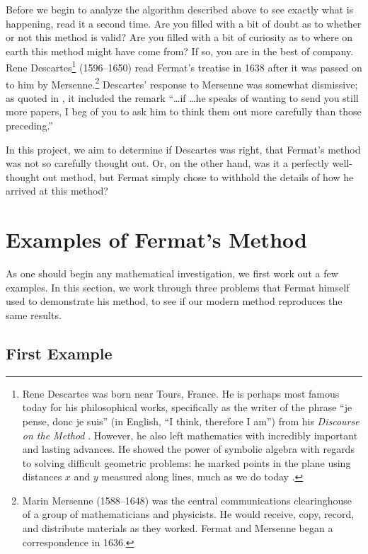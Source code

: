 \documentclass[11pt]{article}
\begin{document}
Before we begin to analyze the algorithm described above to see exactly what is happening, read it a second time.  Are you filled with a bit of doubt as to whether or not this method is valid?  Are you filled with a bit of curiosity as to where on earth this method might have come from?  If so, you are in the best of company.  Rene Descartes\footnote{Rene Descartes was born near Tours, France.  He is perhaps most famous today for his philosophical works, specifically as the writer of the phrase {``\sf je pense, donc je suis''} (in English, ``I think, therefore I am'') from his \emph{Discourse on the Method} \citep{Descartes}.  However, he also left mathematics with incredibly important and lasting advances.  He showed the power of symbolic algebra with regards to solving difficult geometric problems: he marked points in the plane using distances $x$ and $y$ measured along lines, much as we do today \citep{Grabiner}.} (1596--1650) read Fermat's treatise in 1638 after it was passed on to him by Mersenne.\footnote{Marin Mersenne (1588--1648) was the central communications clearinghouse of a group of mathematicians and physicists. He would receive, copy, record, and distribute materials as they worked.  Fermat and Mersenne began a correspondence in 1636.}  Descartes' response to Mersenne was somewhat dismissive; as quoted in \citep[p. 177]{FermatBio},  it included the remark ``{\sf \ldots if \ldots he speaks of wanting to send you still more papers, I beg of you to ask him to think them out more carefully than those preceding.}''  

In this project, we aim to determine if Descartes was right, that Fermat's method was not so carefully thought out.  Or, on the other hand, was it a perfectly well-thought out method, but Fermat simply chose to withhold the details of how he arrived at this method?

\section{Examples of Fermat's Method}

As one should begin any mathematical investigation, we first work out a few examples.  In this section, we work through three problems that Fermat himself used to demonstrate his method, to see if our modern method reproduces the same results.  



\subsection{First Example}\label{First}
\end{document}
